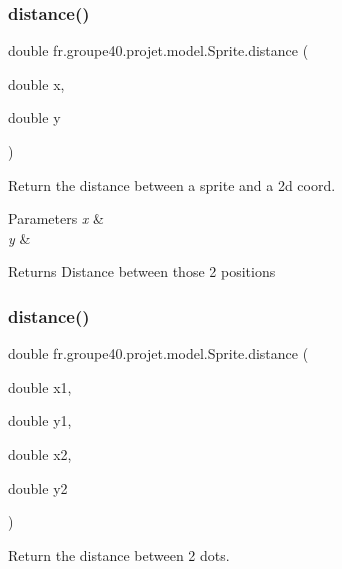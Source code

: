 \subsubsection{\texorpdfstring{distance()}{distance()}\hspace{0.1cm}{\footnotesize\ttfamily [1/3]}}
{\footnotesize\ttfamily double fr.\+groupe40.\+projet.\+model.\+Sprite.\+distance (\begin{DoxyParamCaption}\item[{double}]{x,  }\item[{double}]{y }\end{DoxyParamCaption})}



Return the distance between a sprite and a 2d coord. 


\begin{DoxyParams}{Parameters}
{\em x} & \\
\hline
{\em y} & \\
\hline
\end{DoxyParams}
\begin{DoxyReturn}{Returns}
Distance between those 2 positions 
\end{DoxyReturn}
\mbox{\label{classfr_1_1groupe40_1_1projet_1_1model_1_1_sprite_aa74fb93449c20a79f16edca9a7ae9482}} 
\subsubsection{\texorpdfstring{distance()}{distance()}\hspace{0.1cm}{\footnotesize\ttfamily [2/3]}}
{\footnotesize\ttfamily double fr.\+groupe40.\+projet.\+model.\+Sprite.\+distance (\begin{DoxyParamCaption}\item[{double}]{x1,  }\item[{double}]{y1,  }\item[{double}]{x2,  }\item[{double}]{y2 }\end{DoxyParamCaption})}



Return the distance between 2 dots. 


